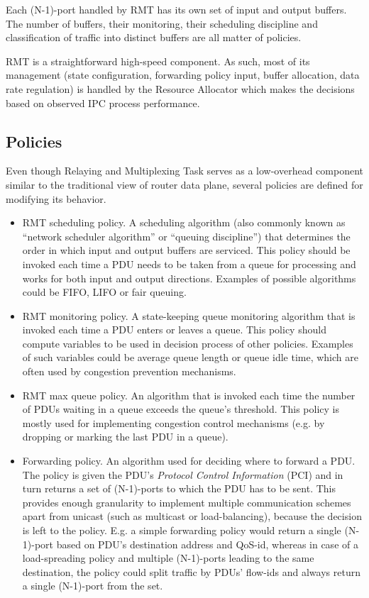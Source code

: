             Each (N-1)-port handled by RMT has its own set of input and output buffers. The number of buffers, their monitoring, their scheduling discipline and classification of traffic into distinct buffers are all matter of policies.

            RMT is a straightforward high-speed component. As such, most of its management (state configuration, forwarding policy input, buffer allocation, data rate regulation) is handled by the Resource Allocator which makes the decisions based on observed IPC process performance.


        \subsection{Policies}

            Even though Relaying and Multiplexing Task serves as a low-overhead component similar to the traditional view of router data plane, several policies are defined for modifying its behavior.

            \begin{itemize}
                \item RMT scheduling policy. A scheduling algorithm (also commonly known as ``network scheduler algorithm'' or ``queuing discipline'') that determines the order in which input and output buffers are serviced. This policy should be invoked each time a PDU needs to be taken from a queue for processing and works for both input and output directions. Examples of possible algorithms could be FIFO, LIFO or fair queuing.
                \item RMT monitoring policy. A state-keeping queue monitoring algorithm that is invoked each time a PDU enters or leaves a queue. This policy should compute variables to be used in decision process of other policies. Examples of such variables could be average queue length or queue idle time, which are often used by congestion prevention mechanisms.
                \item RMT max queue policy. An algorithm that is invoked each time the number of PDUs waiting in a queue exceeds the queue's threshold. This policy is mostly used for implementing congestion control mechanisms (e.g. by dropping or marking the last PDU in a queue).
                \item Forwarding policy. An algorithm used for deciding where to forward a PDU. The policy is given the PDU's \emph{Protocol Control Information} (PCI) and in turn returns a set of (N-1)-ports to which the PDU has to be sent. This provides enough granularity to implement multiple communication schemes apart from unicast (such as multicast or load-balancing), because the decision is left to the policy. E.g. a simple forwarding policy would return a single (N-1)-port based on PDU's destination address and QoS-id, whereas in case of a load-spreading policy and multiple (N-1)-ports leading to the same destination, the policy could split traffic by PDUs' flow-ids and always return a single (N-1)-port from the set.
            \end{itemize}



